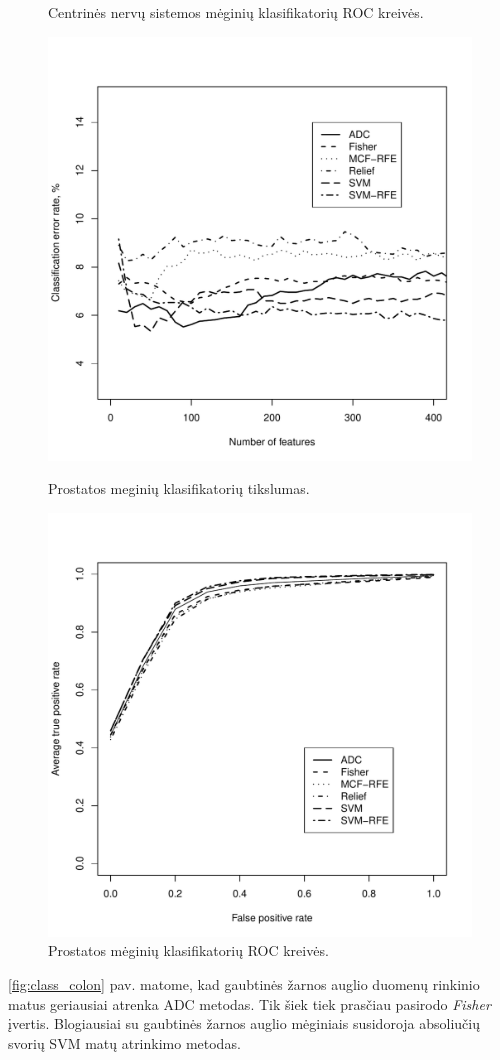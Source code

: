 \begin{figure}[H]
\begin{minipage}[b]{0.5\linewidth}
\caption{Centrinės nervų sistemos mėginių klasifikatorių ROC kreivės.}
\label{fig:roc_cns}
\end{minipage}
\hspace{0.2cm}
\begin{minipage}[b]{0.5\linewidth}
\centering
\includegraphics[width=.85\textwidth]{../bachelor/images/prostate_classification.pdf}
\caption{Prostatos meginių klasifikatorių tikslumas.}
\label{fig:class_prostate}
\end{minipage}
\hspace{0.2cm}
\begin{minipage}[b]{0.5\linewidth}
\centering
\includegraphics[width=.85\textwidth]{../bachelor/images/prostate_roc.pdf}
\caption{Prostatos mėginių klasifikatorių ROC kreivės.}
\label{fig:roc_prostate}
\end{minipage}
\end{figure}
\ref{fig:class_colon} pav. matome, kad gaubtinės žarnos auglio duomenų rinkinio matus geriausiai atrenka ADC metodas. Tik šiek tiek prasčiau pasirodo \textit{Fisher} įvertis. Blogiausiai su gaubtinės žarnos auglio mėginiais susidoroja absoliučių svorių SVM matų atrinkimo metodas.

